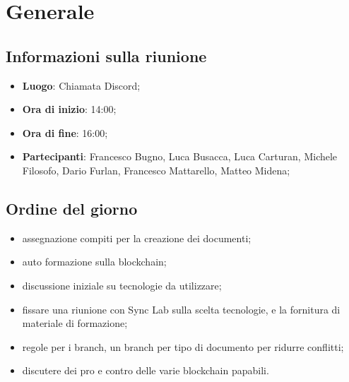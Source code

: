\section{Generale}

\vspace{10pt}


\subsection{Informazioni sulla riunione}
\begin{itemize}
	\item \textbf{Luogo}: Chiamata Discord\glo{};
	\item \textbf{Ora di inizio}: 14:00;
	\item \textbf{Ora di fine}: 16:00;
	\item \textbf{Partecipanti}: Francesco Bugno, Luca Busacca, Luca Carturan, Michele Filosofo,
	Dario Furlan, Francesco Mattarello, Matteo Midena;
\end{itemize}

\vspace{5pt}

\subsection{Ordine del giorno}

\begin{itemize}
	\item assegnazione compiti per la creazione dei documenti;
	\item auto formazione sulla blockchain\glo;
	\item discussione iniziale su tecnologie da utilizzare;
	\item fissare una riunione con Sync Lab sulla scelta tecnologie, e la fornitura di materiale di formazione;
	\item regole per i branch, un branch per tipo di documento per ridurre conflitti;
	\item discutere dei pro e contro delle varie blockchain\glo{} papabili.
\end{itemize}
